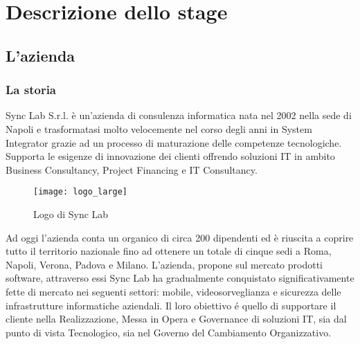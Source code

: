 
\chapter{Descrizione dello stage}
\label{cap:descrizione-stage}



\section{L'azienda}

\subsection{La storia}

Sync Lab S.r.l. è un'azienda di consulenza informatica nata nel 2002 nella sede di Napoli e trasformatasi molto velocemente nel corso degli anni in System Integrator grazie ad un processo di maturazione delle competenze tecnologiche. Supporta le esigenze di innovazione dei clienti offrendo soluzioni IT in ambito Business Consultancy, Project Financing e IT Consultancy.\\
\begin{figure}[H]
	\begin{center}
		\texttt{[image: logo\_large]}
		\caption{Logo di Sync Lab}
	\end{center}
\end{figure}
Ad oggi l'azienda conta un organico di circa 200 dipendenti ed è riuscita a coprire tutto il territorio nazionale fino ad ottenere un totale di cinque sedi a Roma, Napoli, Verona, Padova e Milano. L'azienda, propone sul mercato prodotti software, attraverso essi Sync Lab ha gradualmente conquistato significativamente fette di mercato nei seguenti settori: mobile, videosorveglianza e sicurezza delle infrastrutture informatiche aziendali.
Il loro obiettivo é quello di supportare il cliente nella Realizzazione, Messa in Opera e Governance di soluzioni IT, sia dal punto di vista Tecnologico, sia nel Governo del Cambiamento Organizzativo.

